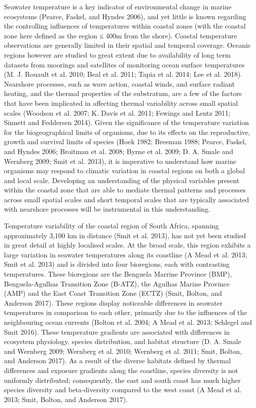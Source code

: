 \documentclass[12pt,A4paper,]{article}
\begin{document}
Seawater temperature is a key indicator of environmental change in
marine ecosystems (Pearce, Faskel, and Hyndes 2006), and yet little is
known regarding the controlling influences of temperatures within
coastal zones (with the coastal zone here defined as the region ≤ 400m
from the shore). Coastal temperature observations are generally limited
in their spatial and temporal coverage. Oceanic regions however are
studied to great extent due to availability of long term datasets from
moorings and satellites of monitoring ocean surface temperatures (M. J.
Rouault et al. 2010; Beal et al. 2011; Tapia et al. 2014; Lee et al.
2018). Nearshore processes, such as wave action, coastal winds, and
surface radiant heating, and the thermal properties of the substratum,
are a few of the factors that have been implicated in affecting thermal
variability across small spatial scales (Woodson et al. 2007; K. Davis
et al. 2011; Fewings and Lentz 2011; Sinnett and Feddersen 2014). Given
the significance of the temperature variation for the biogeographical
limits of organisms, due to its effects on the reproductive, growth and
survival limits of species (Hoek 1982; Breeman 1988; Pearce, Faskel, and
Hyndes 2006; Broitman et al. 2008; Byrne et al. 2009; D. A. Smale and
Wernberg 2009; Smit et al. 2013), it is imperative to understand how
marine organisms may respond to climatic variation in coastal regions on
both a global and local scale. Developing an understanding of the
physical variables present within the coastal zone that are able to
mediate thermal patterns and processes across small spatial scales and
short temporal scales that are typically associated with nearshore
processes will be instrumental in this understanding.

Temperature variability of the coastal region of South Africa, spanning
approximately 3,100 km in distance (Smit et al. 2013), has not yet been
studied in great detail at highly localised scales. At the broad scale,
this region exhibits a large variation in seawater temperatures along
its coastline (A Mead et al. 2013; Smit et al. 2013) and is divided into
four bioregions, each with contrasting temperatures. These bioregions
are the Benguela Marrine Province (BMP), Benguela-Agulhas Transition
Zone (B-ATZ), the Agulhas Marine Province (AMP) and the East Coast
Transition Zone (ECTZ) (Smit, Bolton, and Anderson 2017). These regions
display noticeable differences in seawater temperatures in comparison to
each other, primarily due to the influences of the neighbouring ocean
currents (Bolton et al. 2004; A Mead et al. 2013; Schlegel and Smit
2016). These temperature gradients are associated with differences in
ecosystem physiology, species distribution, and habitat structure (D. A.
Smale and Wernberg 2009; Wernberg et al. 2010; Wernberg et al. 2011;
Smit, Bolton, and Anderson 2017). As a result of the diverse habitats
defined by thermal differences and exposure gradients along the
coastline, species diversity is not uniformly distributed; consequently,
the east and south coast has much higher species diversity and
beta-diversity compared to the west coast (A Mead et al. 2013; Smit,
Bolton, and Anderson 2017).
\end{document}
